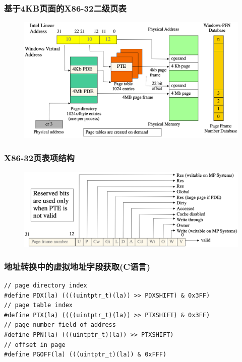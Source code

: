 \begin{frame}
    \frametitle{基于4KB页面的X86-32二级页表}
    \begin{figure}
    \includegraphics[width=0.8\linewidth]{figs/x86-32-addr-translation.png}
    \end{figure}
\end{frame}
% 
% 
% 
\begin{frame}
    \frametitle{X86-32页表项结构}
    \begin{figure}
    \includegraphics[width=0.8\linewidth]{figs/x86-32-page-tabel-entry.png}
    \end{figure}
\end{frame}
% 
% 
\begin{frame}
    \frametitle{地址转换中的虚拟地址字段获取(C语言)}
    \begin{block}{}
    \begin{verbatim}
// page directory index
#define PDX(la) ((((uintptr_t)(la)) >> PDXSHIFT) & 0x3FF)
// page table index
#define PTX(la) ((((uintptr_t)(la)) >> PTXSHIFT) & 0x3FF)
// page number field of address
#define PPN(la) (((uintptr_t)(la)) >> PTXSHIFT)
// offset in page
#define PGOFF(la) (((uintptr_t)(la)) & 0xFFF)
    \end{verbatim}
    \end{block}
\end{frame}
